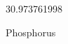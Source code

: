 \documentclass[12pt]{article}
\begin{document}
\hfill{}
\vfill
\begin{center}
  {\fontsize{50}{60}
  }

  \vspace{1em}

  30.973761998

Phosphorus
\end{center}
\vfill
\end{document}
